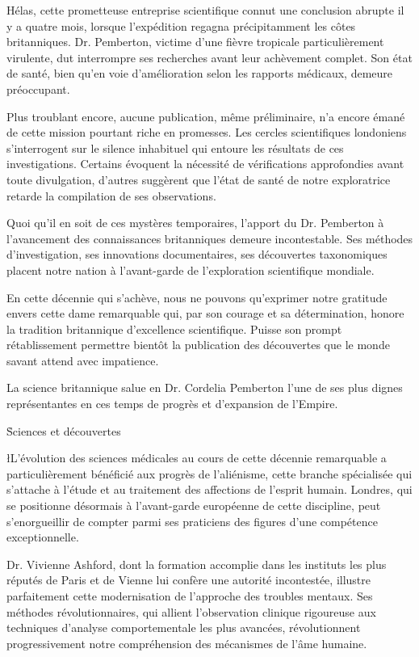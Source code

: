 \documentclass{news}
\begin{document}
Hélas, cette prometteuse entreprise scientifique connut une conclusion abrupte il y a quatre mois, lorsque l'expédition regagna précipitamment les côtes britanniques. Dr. Pemberton, victime d'une fièvre tropicale particulièrement virulente, dut interrompre ses recherches avant leur achèvement complet. Son état de santé, bien qu'en voie d'amélioration selon les rapports médicaux, demeure préoccupant.

Plus troublant encore, aucune publication, même préliminaire, n'a encore émané de cette mission pourtant riche en promesses. Les cercles scientifiques londoniens s'interrogent sur le silence inhabituel qui entoure les résultats de ces investigations. Certains évoquent la nécessité de vérifications approfondies avant toute divulgation, d'autres suggèrent que l'état de santé de notre exploratrice retarde la compilation de ses observations.

Quoi qu'il en soit de ces mystères temporaires, l'apport du Dr. Pemberton à l'avancement des connaissances britanniques demeure incontestable. Ses méthodes d'investigation, ses innovations documentaires, ses découvertes taxonomiques placent notre nation à l'avant-garde de l'exploration scientifique mondiale.

En cette décennie qui s'achève, nous ne pouvons qu'exprimer notre gratitude envers cette dame remarquable qui, par son courage et sa détermination, honore la tradition britannique d'excellence scientifique. Puisse son prompt rétablissement permettre bientôt la publication des découvertes que le monde savant attend avec impatience.

La science britannique salue en Dr. Cordelia Pemberton l'une de ses plus dignes représentantes en ces temps de progrès et d'expansion de l'Empire.

\h{Sciences et découvertes}

\l{L}'évolution des sciences médicales au cours de cette décennie remarquable a particulièrement bénéficié aux progrès de l'aliénisme, cette branche spécialisée qui s'attache à l'étude et au traitement des affections de l'esprit humain. Londres, qui se positionne désormais à l'avant-garde européenne de cette discipline, peut s'enorgueillir de compter parmi ses praticiens des figures d'une compétence exceptionnelle.

Dr. Vivienne Ashford, dont la formation accomplie dans les instituts les plus réputés de Paris et de Vienne lui confère une autorité incontestée, illustre parfaitement cette modernisation de l'approche des troubles mentaux. Ses méthodes révolutionnaires, qui allient l'observation clinique rigoureuse aux techniques d'analyse comportementale les plus avancées, révolutionnent progressivement notre compréhension des mécanismes de l'âme humaine.
\end{document}

